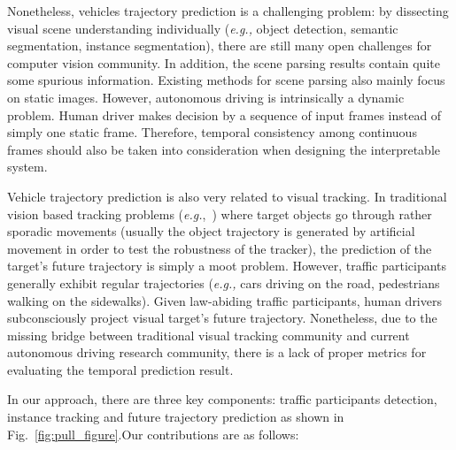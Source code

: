 \documentclass[10pt,twocolumn,letterpaper]{article}
\begin{document}

Nonetheless, vehicles trajectory prediction is a challenging problem: by dissecting visual scene understanding individually (\emph{e.g.,} object detection, semantic segmentation, instance segmentation),  there are still many open challenges for computer vision community.
In addition, the scene parsing results contain quite some spurious information.
Existing methods for scene parsing also mainly focus on static images.
However, autonomous driving is intrinsically a dynamic problem. Human driver makes decision by a sequence of input frames instead of simply one static frame.
Therefore, temporal consistency among continuous frames should also be taken into consideration when designing the interpretable system.



Vehicle trajectory prediction is also very related to visual tracking.
In traditional vision based tracking problems (\emph{e.g.},~\cite{wu2013online, wu2015object, mueller2016benchmark}) where target objects go through rather sporadic movements (usually the object trajectory is generated by artificial movement in order to test the robustness of the tracker), the prediction of the target's future trajectory is simply a moot problem.
However, traffic participants generally exhibit regular trajectories (\emph{e.g.,} cars driving on the road, pedestrians walking on the sidewalks). Given law-abiding traffic participants, human drivers subconsciously project visual target's future trajectory.
Nonetheless, due to the missing bridge between traditional visual tracking community and current autonomous driving research community, there is a lack of proper metrics for evaluating the temporal prediction result.



In our approach, there are three key components: traffic participants detection, instance tracking and future trajectory prediction as shown in Fig.~\ref{fig:pull_figure}.Our contributions are as follows:
\end{document}
